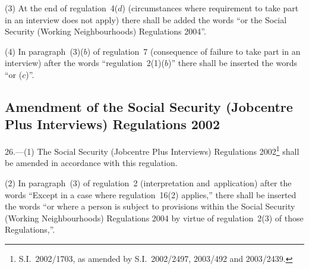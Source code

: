 \documentclass[12pt,a4paper]{article}
\begin{document}
(3) At the end of regulation~4($d$)  (circumstances where requirement to take part in an interview does not apply) there shall be added the words “or the Social Security (Working Neighbourhoods) Regulations 2004”.

(4) In paragraph~(3)($b$)  of regulation~7 (consequence of failure to take part in an interview) after the words “regulation~2(1)($b$)” there shall be inserted the words “or ($c$)”.

\subsection[26. Amendment of the Social Security (Jobcentre Plus Interviews) Regulations 2002]{Amendment of the Social Security (Jobcentre Plus Interviews) Regulations 2002}

26.---(1)  The Social Security (Jobcentre Plus Interviews) Regulations 2002\footnote{S.I.~2002/1703, as amended by S.I.~2002/2497, 2003/492 and 2003/2439.} shall be amended in accordance with this regulation.

(2) In paragraph~(3) of regulation~2 (interpretation and~application) after the words “Except in a case where regulation~16(2) applies,” there shall be inserted the words “or where a person is subject to provisions within the Social Security (Working Neighbourhoods) Regulations 2004 by virtue of regulation~2(3) of those Regulations,”.
\end{document}
